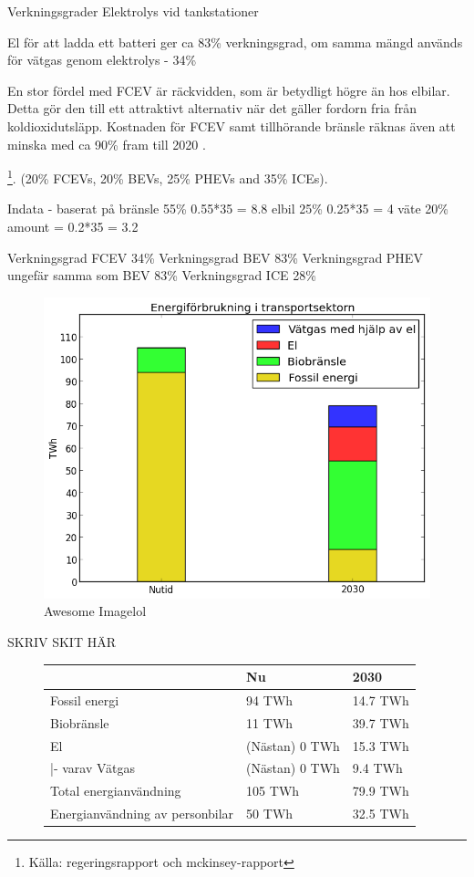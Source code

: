 \documentclass[a4paper,11pt,fleqn, titlepage]{article}
\begin{document}
Verkningsgrader
Elektrolys vid tankstationer

El för att ladda ett batteri ger ca 83\% verkningsgrad, om samma mängd används för vätgas genom elektrolys - 34\%

En stor fördel med FCEV är räckvidden, som är betydligt högre än hos
elbilar. Detta gör den till ett attraktivt alternativ när det gäller
fordorn fria från koldioxidutsläpp. Kostnaden för FCEV samt tillhörande
bränsle räknas även att minska med ca 90\% fram till 2020 \cite{mckinsey}.

\footnote{Källa: regeringsrapport och mckinsey-rapport}.
(20\% FCEVs, 20\% BEVs, 25\% PHEVs and 35\% ICEs).

Indata - baserat på
bränsle 55\% 0.55*35 = 8.8
elbil 25\% 0.25*35 = 4
väte 20\% amount = 0.2*35 = 3.2

Verkningsgrad FCEV 34\%
Verkningsgrad BEV 83\%
Verkningsgrad PHEV ungefär samma som BEV 83\%
Verkningsgrad ICE 28\%

\begin{figure}[h!]
       \centering
       \includegraphics[scale=0.7]{scen2transport.png}
       \caption{Awesome Imagelol}
       \label{fig:scen2transport}
\end{figure}

SKRIV SKIT HÄR

\begin{figure}[h!]
	\centering
	\label{tab:scen2energi}
	\begin{tabular}{ | l | l | l | }
	\hline
						& Nu		& 2030 \\ \hline
	Fossil energi				& 94 TWh	& 14.7 TWh \\ \hline
	Biobränsle				& 11 TWh	& 39.7 TWh \\ \hline %
	El					& (Nästan) 0 TWh &  15.3 TWh \\ \hline %
	|- varav Vätgas     & (Nästan) 0 TWh & 9.4 TWh\\ \hline
	Total energianvändning		& 105 TWh	& 79.9 TWh \\ \hline
	Energianvändning av personbilar	& 50 TWh	& 32.5 TWh \\ \hline
	\end{tabular}
\end{figure}
\end{document}
